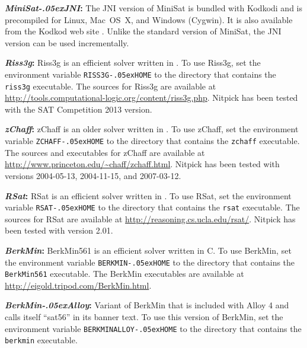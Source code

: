 \documentclass[a4paper,12pt]{article}
\renewcommand\_{\hbox{\textunderscore\kern-.05ex}}
\begin{document}
\begin{enum}
\begin{enum}
\item[\labelitemi] \textbf{\textit{MiniSat\_JNI}:} The JNI
version of MiniSat is bundled with Kodkodi and is precompiled for Linux,
Mac~OS~X, and Windows (Cygwin). It is also available from the Kodkod web site
\cite{kodkod-2009}. Unlike the standard version of MiniSat, the JNI version can
be used incrementally.

\item[\labelitemi] \textbf{\textit{Riss3g}:} Riss3g is an efficient solver written in
\cpp{}. To use Riss3g, set the environment variable \texttt{RISS3G\_HOME} to the
directory that contains the \texttt{riss3g} executable.%
The \cpp{} sources for Riss3g are available at
\url{http://tools.computational-logic.org/content/riss3g.php}.
Nitpick has been tested with the SAT Competition 2013 version.

\item[\labelitemi] \textbf{\textit{zChaff}:} zChaff is an older solver written
in \cpp{}. To use zChaff, set the environment variable \texttt{ZCHAFF\_HOME} to
the directory that contains the \texttt{zchaff} executable.%
The \cpp{} sources and executables for zChaff are available at
\url{http://www.princeton.edu/~chaff/zchaff.html}. Nitpick has been tested with
versions 2004-05-13, 2004-11-15, and 2007-03-12.

\item[\labelitemi] \textbf{\textit{RSat}:} RSat is an efficient solver written in
\cpp{}. To use RSat, set the environment variable \texttt{RSAT\_HOME} to the
directory that contains the \texttt{rsat} executable.%
The \cpp{} sources for RSat are available at
\url{http://reasoning.cs.ucla.edu/rsat/}. Nitpick has been tested with version
2.01.

\item[\labelitemi] \textbf{\textit{BerkMin}:} BerkMin561 is an efficient solver
written in C. To use BerkMin, set the environment variable
\texttt{BERKMIN\_HOME} to the directory that contains the \texttt{BerkMin561}
executable.
The BerkMin executables are available at
\url{http://eigold.tripod.com/BerkMin.html}.

\item[\labelitemi] \textbf{\textit{BerkMin\_Alloy}:} Variant of BerkMin that is
included with Alloy 4 and calls itself ``sat56'' in its banner text. To use this
version of BerkMin, set the environment variable
\texttt{BERKMINALLOY\_HOME} to the directory that contains the \texttt{berkmin}
executable.%


\end{enum}
\end{enum}
\end{document}
